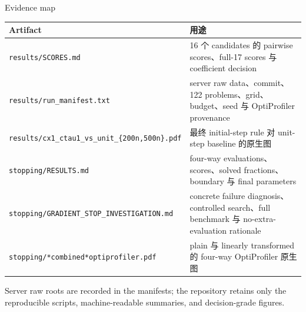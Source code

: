 \documentclass[aspectratio=169,10pt]{beamer}
\begin{document}
\begin{frame}{Evidence map}
\small
\begin{tabularx}{\textwidth}{lX}
\toprule
Artifact & 用途 \\
\midrule
\texttt{results/SCORES.md} & 16 个 candidates 的 pairwise scores、full-17 scores 与 coefficient decision \\
\texttt{results/run\_manifest.txt} & server raw data、commit、122 problems、grid、budget、seed 与 OptiProfiler provenance \\
\texttt{results/cx1\_ctau1\_vs\_unit\_\{200n,500n\}.pdf} & 最终 initial-step rule 对 unit-step baseline 的原生图 \\
\texttt{stopping/RESULTS.md} & four-way evaluations、scores、solved fractions、boundary 与 final parameters \\
\texttt{stopping/GRADIENT\_STOP\_INVESTIGATION.md} & concrete failure diagnosis、controlled search、full benchmark 与 no-extra-evaluation rationale \\
\texttt{stopping/*combined*optiprofiler.pdf} & plain 与 linearly transformed 的 four-way OptiProfiler 原生图 \\
\bottomrule
\end{tabularx}

\vfill
\centering\footnotesize
Server raw roots are recorded in the manifests; the repository retains only the reproducible scripts, machine-readable summaries, and decision-grade figures.
\end{frame}
\end{document}
